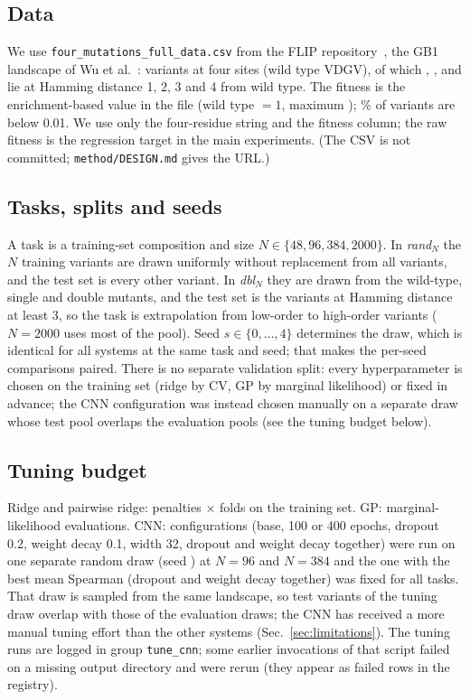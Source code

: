 \subsection{Data}
We use \texttt{four\_mutations\_full\_data.csv} from the FLIP repository~\cite{dallago2021flip}, the GB1 landscape of Wu et al.~\cite{wu2016adaptation}:  variants at four sites (wild type VDGV), of which , ,  and  lie at Hamming distance 1, 2, 3 and 4 from wild type. The fitness is the enrichment-based value in the file (wild type $=1$, maximum ); \% of variants are below 0.01. We use only the four-residue string and the fitness column; the raw fitness is the regression target in the main experiments. (The CSV is not committed; \texttt{method/DESIGN.md} gives the URL.)

\subsection{Tasks, splits and seeds}
A task is a training-set composition and size $N\in\{48,96,384,2000\}$. In \emph{rand}$_N$ the $N$ training variants are drawn uniformly without replacement from all variants, and the test set is every other variant. In \emph{dbl}$_N$ they are drawn from the  wild-type, single and double mutants, and the test set is the  variants at Hamming distance at least 3, so the task is extrapolation from low-order to high-order variants ($N{=}2000$ uses most of the pool). Seed $s\in\{0,\dots,4\}$ determines the draw, which is identical for all systems at the same task and seed; that makes the per-seed comparisons paired. There is no separate validation split: every hyperparameter is chosen on the training set (ridge by CV, GP by marginal likelihood) or fixed in advance; the CNN configuration was instead chosen manually on a separate draw whose test pool overlaps the evaluation pools (see the tuning budget below).

\subsection{Tuning budget}
Ridge and pairwise ridge:  penalties $\times$  folds on the training set. GP:  marginal-likelihood evaluations. CNN:  configurations (base, 100 or 400 epochs, dropout 0.2, weight decay 0.1, width 32, dropout and weight decay together) were run on one separate random draw (seed ) at $N=96$ and $N=384$ and the one with the best mean Spearman (dropout and weight decay together) was fixed for all tasks. That draw is sampled from the same landscape, so test variants of the tuning draw overlap with those of the evaluation draws; the CNN has received a more manual tuning effort than the other systems (Sec.~\ref{sec:limitations}). The tuning runs are logged in group \texttt{tune\_cnn}; some earlier invocations of that script failed on a missing output directory and were rerun (they appear as failed rows in the registry).

